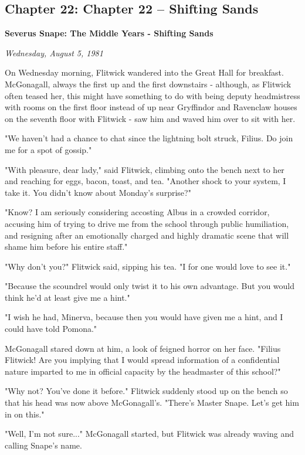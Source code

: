 \documentclass[a4paper,11pt]{article}
\begin{document}
\subsection{Chapter 22: Chapter 22 – Shifting Sands}

\textbf{Severus Snape: The Middle Years - Shifting Sands}

\emph{Wednesday, August 5, 1981}

On Wednesday morning, Flitwick wandered into the Great Hall for breakfast. McGonagall, always the first up and the first downstairs - although, as Flitwick often teased her, this might have something to do with being deputy headmistress with rooms on the first floor instead of up near Gryffindor and Ravenclaw houses on the seventh floor with Flitwick - saw him and waved him over to sit with her.

"We haven't had a chance to chat since the lightning bolt struck, Filius. Do join me for a spot of gossip."

"With pleasure, dear lady," said Flitwick, climbing onto the bench next to her and reaching for eggs, bacon, toast, and tea. "Another shock to your system, I take it. You didn't know about Monday's surprise?"

"Know? I am seriously considering accosting Albus in a crowded corridor, accusing him of trying to drive me from the school through public humiliation, and resigning after an emotionally charged and highly dramatic scene that will shame him before his entire staff."

"Why don't you?" Flitwick said, sipping his tea. "I for one would love to see it."

"Because the scoundrel would only twist it to his own advantage. But you would think he'd at least give me a hint."

"I wish he had, Minerva, because then you would have given me a hint, and I could have told Pomona."

McGonagall stared down at him, a look of feigned horror on her face. "Filius Flitwick! Are you implying that I would spread information of a confidential nature imparted to me in official capacity by the headmaster of this school?"

"Why not? You've done it before." Flitwick suddenly stood up on the bench so that his head was now above McGonagall's. "There's Master Snape. Let's get him in on this."

"Well, I'm not sure..." McGonagall started, but Flitwick was already waving and calling Snape's name.
\end{document}
